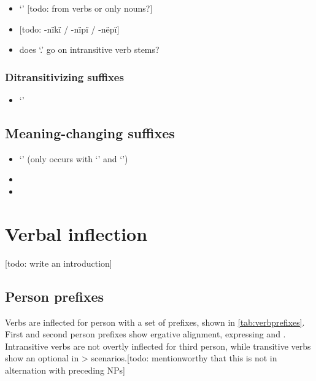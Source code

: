 \documentclass{memoir}
\begin{document}
\begin{itemize}
\tightlist
\item
   `' {[}todo: from verbs or only nouns?{]}
\item
  {[}todo: -nïkï / -nïpï / -nëpï{]}
\item
  does  `.' go on intransitive verb stems?
\end{itemize}

\subsection{\texorpdfstring{Ditransitivizing suffixes
\label{sec:ditrz}}{Ditransitivizing suffixes }}

\begin{itemize}
\tightlist
\item
   `'
\end{itemize}

\section{\texorpdfstring{Meaning-changing suffixes
\label{sec:meaningderiv}}{Meaning-changing suffixes }}

\begin{itemize}
\item
   `' (only occurs with  `' and
   `')
\item
\item
\end{itemize}

\chapter{\texorpdfstring{Verbal inflection
\label{verbinfl}}{Verbal inflection }}

{[}todo: write an introduction{]}

\section{\texorpdfstring{Person prefixes
\label{sec:verbperson}}{Person prefixes }}

Verbs are inflected for person with a set of prefixes, shown in
\cref{tab:verbprefixes}. First and second person prefixes show ergative
alignment, expressing  and . Intransitive verbs are not
overtly inflected for third person, while transitive verbs show an
optional  in \textgreater{} scenarios.{[}todo:
mentionworthy that this is not in alternation with preceding NPs{]}
\end{document}
